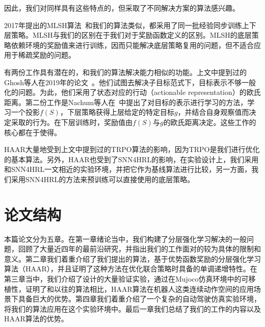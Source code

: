 因此，我们对同样具有这些特点的，但采取了不同解决方案的算法感兴趣。

2017年提出的MLSH算法~\cite{MLSH}和我们的算法类似，都采用了同一批经验同步训练上下层策略。MLSH与我们的区别在于我们对于奖励函数定义的区别。MLSH的底层策略依赖环境的奖励值来进行训练，因而只能解决底层策略复用的问题，但不适合应用于稀疏奖励的问题。

有两份工作具有潜在的，和我们的算法解决能力相似的功能。上文中提到过的Ghosh等人在2019年的论文~。他们试图去解决子目标范式下，目标表示不够一般化的问题。为此，他们采用了状态对应的行动（actionable representation）的欧氏距离。第二份工作是Nachum等人在~中提出了对目标的表示进行学习的方法，学习一个投影$f(S)$，下层策略获得上层给定的特定目标$g$，并结合自身观察值而决定采取的行为。在下层训练时，奖励值由$f(S)$与$g$的欧氏距离决定。这些工作的核心都在于使得。

HAAR大量地受到上文中提到过的TRPO算法的影响，因为TRPO是我们进行优化的基本算法。另外，HAAR也受到了SNN4HRL的影响，在实验设计上，我们采用和SNN4HRL一文相近的实验环境，并把它作为基线算法进行比较，另一方面，我们采用SNN4HRL的方法来预训练可以直接使用的底层策略。

\section{论文结构}
本篇论文分为五章。在第一章绪论当中，我们构建了分层强化学习解决的一般问题，回顾了大量近四年的最前沿研究，并指出我们的工作面对的较为具体的限制和意义。第二章我们着重介绍了我们提出的算法，基于优势函数奖励的分层强化学习算法（HAAR），并且证明了这种方法在优化联合策略时具备的单调递增特性。在第三章当中，我们介绍了设计的大量验证实验，通过在Mujoco仿真环境中的可移植性，证明了和以往的算法相比，HAAR算法在机器人这类连续动作空间的应用场景下具备巨大的优势。第四章我们着重介绍了一个复杂的自动驾驶仿真实验环境，将我们的算法应用在这个实验环境中。最后一章我们总结了我们的工作的内容以及HAAR算法的优势。